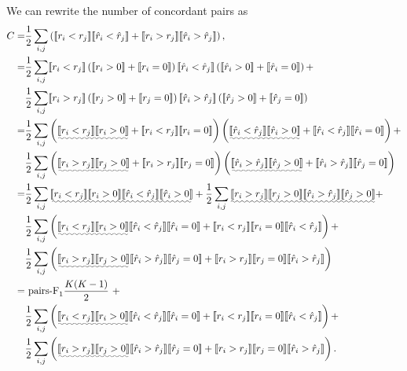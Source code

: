 We can rewrite the number of concordant pairs as
\begin{align*}
C =& \frac{1}{2} \sum_{i,j} \left(\llb r_i < r_j \rrb  \llb \hat{r}_i < \hat{r}_j \rrb +
     \llb r_i > r_j \rrb  \llb \hat{r}_i > \hat{r}_j \rrb \right), \\
  =& \frac{1}{2} \sum_{i,j} \llb r_i < r_j \rrb  
     \left( \llb r_i > 0 \rrb + \llb r_i = 0 \rrb \right)  
     \llb \hat{r}_i < \hat{r}_j \rrb 
     \left( \llb \hat{r}_i > 0 \rrb + \llb \hat{r}_i = 0 \rrb \right) + \\
   & \frac{1}{2} \sum_{i,j} \llb r_i > r_j \rrb  
     \left( \llb r_j > 0 \rrb + \llb r_j = 0 \rrb \right) 
     \llb \hat{r}_i > \hat{r}_j \rrb 
     \left( \llb \hat{r}_j > 0 \rrb + \llb \hat{r}_j = 0 \rrb \right) \\
  =& \frac{1}{2} \sum_{i,j} \left( \uwave{\llb r_i < r_j \rrb  \llb r_i > 0 \rrb} +
            \llb r_i < r_j \rrb  \llb r_i = 0 \rrb \right)  
     \left( \uwave{\llb \hat{r}_i < \hat{r}_j \rrb  \llb \hat{r}_i > 0 \rrb} + 
            \llb \hat{r}_i < \hat{r}_j \rrb  \llb \hat{r}_i = 0 \rrb \right) + \\
   & \frac{1}{2} \sum_{i,j} \left( \uwave{\llb r_i > r_j \rrb  \llb r_j > 0 \rrb} + 
            \llb r_i > r_j \rrb  \llb r_j = 0 \rrb \right) 
     \left( \uwave{\llb \hat{r}_i > \hat{r}_j \rrb  \llb \hat{r}_j > 0 \rrb} + 
            \llb \hat{r}_i > \hat{r}_j \rrb  \llb \hat{r}_j = 0 \rrb \right) \\
  =& \frac{1}{2} \sum_{i,j} \uwave{\llb r_i < r_j \rrb  \llb r_i > 0 \rrb 
                         \llb \hat{r}_i < \hat{r}_j \rrb  \llb \hat{r}_i > 0 \rrb} +
     \frac{1}{2} \sum_{i,j} \uwave{\llb r_i > r_j \rrb  \llb r_j > 0 \rrb 
                         \llb \hat{r}_i > \hat{r}_j \rrb  \llb \hat{r}_j > 0 \rrb} + \\
   & \frac{1}{2} \sum_{i,j} \left( \uwave{\llb r_i < r_j \rrb  \llb r_i > 0 \rrb} 
                         \llb \hat{r}_i < \hat{r}_j \rrb  \llb \hat{r}_i = 0 \rrb + 
                         \llb r_i < r_j \rrb  \llb r_i = 0 \rrb  
                         \llb \hat{r}_i < \hat{r}_j \rrb \right) + \\ 
   & \frac{1}{2} \sum_{i,j} \left( \uwave{\llb r_i > r_j \rrb  \llb r_j > 0 \rrb} 
                         \llb \hat{r}_i > \hat{r}_j \rrb  \llb \hat{r}_j = 0 \rrb +
                         \llb r_i > r_j \rrb  \llb r_j = 0 \rrb 
                         \llb \hat{r}_i > \hat{r}_j \rrb \right) \\
  =& ~\text{pairs-F}_1  \frac{K(K-1)}{2}~ + \\
   & \frac{1}{2} \sum_{i,j} \left( \uwave{\llb r_i < r_j \rrb  \llb r_i > 0 \rrb} 
                         \llb \hat{r}_i < \hat{r}_j \rrb  \llb \hat{r}_i = 0 \rrb + 
                         \llb r_i < r_j \rrb  \llb r_i = 0 \rrb  
                         \llb \hat{r}_i < \hat{r}_j \rrb \right) + \\ 
   & \frac{1}{2} \sum_{i,j} \left( \uwave{\llb r_i > r_j \rrb  \llb r_j > 0 \rrb} 
                         \llb \hat{r}_i > \hat{r}_j \rrb  \llb \hat{r}_j = 0 \rrb +
                         \llb r_i > r_j \rrb  \llb r_j = 0 \rrb 
                         \llb \hat{r}_i > \hat{r}_j \rrb \right).
\end{align*}
